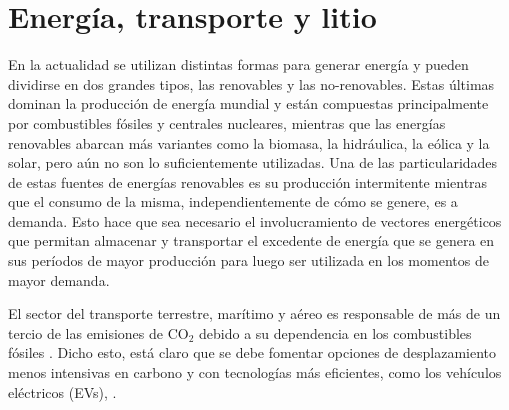 \section{Energía, transporte y litio}

En la actualidad se utilizan distintas formas para generar energía y pueden 
dividirse en dos grandes tipos, las renovables y las no-renovables. Estas últimas
dominan la producción de energía mundial y están compuestas principalmente por 
combustibles fósiles y centrales nucleares, mientras que las energías renovables
abarcan más variantes como la biomasa, la hidráulica, la eólica y la solar, pero 
aún no son lo suficientemente utilizadas. Una de las particularidades de estas 
fuentes de energías renovables es su producción intermitente mientras que el 
consumo de la misma, independientemente de cómo se genere, es a demanda. Esto 
hace que sea necesario el involucramiento de vectores energéticos que permitan 
almacenar y transportar el excedente de energía que se genera en sus períodos de 
mayor producción para luego ser utilizada en los momentos de mayor demanda.

El sector del transporte terrestre, marítimo y aéreo es responsable de más de un 
tercio de las emisiones de CO$_2$ debido a su dependencia en los combustibles 
fósiles . Dicho esto, está claro que se debe fomentar opciones de desplazamiento menos intensivas
en carbono y con tecnologías más eficientes, como los vehículos eléctricos (EVs),
.

